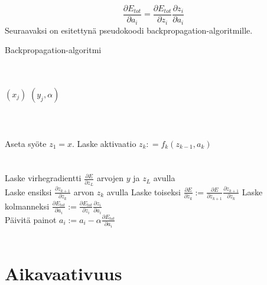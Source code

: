 \documentclass[11pt]{article}
\begin{document}
\begin{equation*}
\frac{\partial E_{tot}}{\partial  a_{i}} = \frac{\partial E_{tot}}{\partial  z_{i}} \frac{\partial z_{i}}{\partial  a_{i}}
\end{equation*}
Seuraavaksi on esitettynä pseudokoodi backpropagation-algoritmille.

\begin{algorithm}
\caption{Backpropagation-algoritmi}
\label{Backprop}
\begin{algorithmic}[1]

 \\
 \\
	\State {}$(x_j)$
	\State {}$(y_j, \alpha)$ \\
\EndFor \\
\EndProcedure 
\\
\label{Forward}
 \\
\State Aseta syöte $z_1 = x$.
\State Laske aktivaatio $z_k: = f_k(z_{k - 1}, a_k)$
\EndFor \\
\EndProcedure \\
 \\
\label{Backward}
\State Laske virhegradientti $\frac{\partial E}{\partial  z_{L}}$ arvojen $y$ ja $z_L$ avulla
 \\
\State Laske ensiksi $\frac{\partial z_{k + 1}}{\partial  z_{k}}$ arvon $z_k$ avulla
\State Laske toiseksi $\frac{\partial E}{\partial  z_{k}} := \frac{\partial E}{\partial  z_{k + 1}} \frac{\partial z_{k + 1}}{\partial  z_{k}}$
\State Laske kolmanneksi $\frac{\partial E_{tot}}{\partial  a_{i}} := \frac{\partial E_{tot}}{\partial  z_{i}} \frac{\partial z_{i}}{\partial  a_{i}}$
\\
\State Päivitä painot $a_i := a_i - \alpha \frac{\partial E_{tot}}{\partial  a_{i}}$ \\
\EndFor \\

\EndProcedure
\end{algorithmic}
\end{algorithm}

\section{Aikavaativuus}
\end{document}
